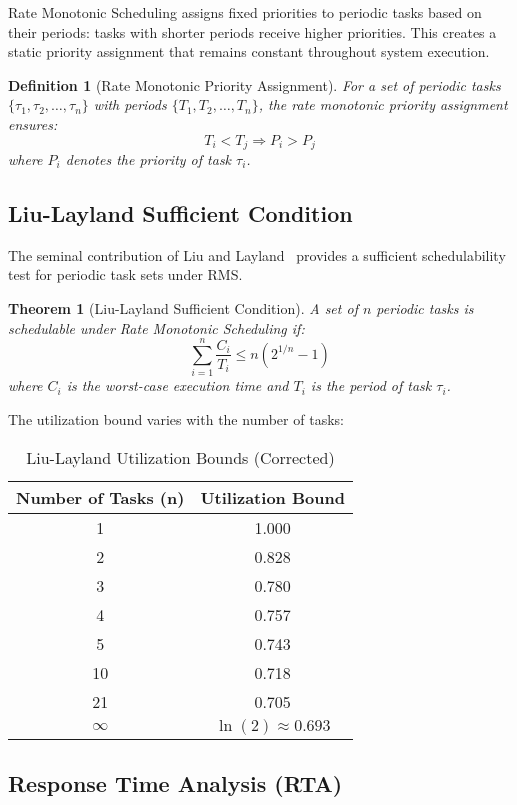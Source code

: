 \documentclass[12pt,a4paper]{article}
\newtheorem{theorem}{Theorem}
\newtheorem{definition}{Definition}
\begin{document}
Rate Monotonic Scheduling assigns fixed priorities to periodic tasks based on their periods: tasks with shorter periods receive higher priorities. This creates a static priority assignment that remains constant throughout system execution.

\begin{definition}[Rate Monotonic Priority Assignment]
For a set of periodic tasks $\{\tau_1, \tau_2, \ldots, \tau_n\}$ with periods $\{T_1, T_2, \ldots, T_n\}$, the rate monotonic priority assignment ensures:
$$T_i < T_j \Rightarrow P_i > P_j$$
where $P_i$ denotes the priority of task $\tau_i$.
\end{definition}

\subsection{Liu-Layland Sufficient Condition}

The seminal contribution of Liu and Layland~\cite{liu1973scheduling} provides a sufficient schedulability test for periodic task sets under RMS.

\begin{theorem}[Liu-Layland Sufficient Condition]
A set of $n$ periodic tasks is schedulable under Rate Monotonic Scheduling if:
$$\sum_{i=1}^{n} \frac{C_i}{T_i} \leq n(2^{1/n} - 1)$$
where $C_i$ is the worst-case execution time and $T_i$ is the period of task $\tau_i$.
\end{theorem}

The utilization bound varies with the number of tasks:

\begin{table}[h!]
\centering
\caption{Liu-Layland Utilization Bounds (Corrected)}
\begin{tabular}{cc}
\toprule
\textbf{Number of Tasks (n)} & \textbf{Utilization Bound} \\
\midrule
1 & 1.000 \\
2 & 0.828 \\
3 & 0.780 \\
4 & 0.757 \\
5 & 0.743 \\
10 & 0.718 \\
21 & 0.705 \\
$\infty$ & $\ln(2) \approx 0.693$ \\
\bottomrule
\end{tabular}
\end{table}

\subsection{Response Time Analysis (RTA)}
\end{document}
